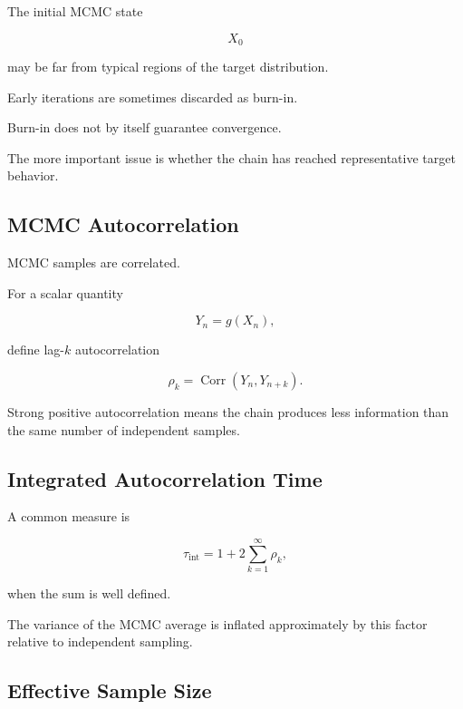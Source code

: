 The initial MCMC state

\[
X_0
\]

may be far from typical regions of the target distribution.

Early iterations are sometimes discarded as burn-in.

Burn-in does not by itself guarantee convergence.

The more important issue is whether the chain has reached representative
target behavior.

\subsection{MCMC Autocorrelation}
\label{subsec:mcmc-autocorrelation}

MCMC samples are correlated.

For a scalar quantity

\[
Y_n=g(X_n),
\]

define lag-\(k\) autocorrelation

\[
\boxed{
\rho_k
=
\operatorname{Corr}
(
Y_n,Y_{n+k}
).
}
\]

Strong positive autocorrelation means the chain produces less information
than the same number of independent samples.

\subsection{Integrated Autocorrelation Time}
\label{subsec:integrated-autocorrelation-time}

A common measure is

\[
\boxed{
\tau_{\mathrm{int}}
=
1
+
2
\sum_{k=1}^{\infty}
\rho_k,
}
\]

when the sum is well defined.

The variance of the MCMC average is inflated approximately by this factor
relative to independent sampling.

\subsection{Effective Sample Size}
\label{subsec:effective-sample-size}


